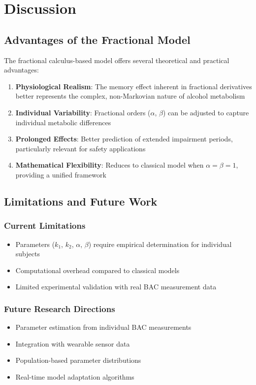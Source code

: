 \documentclass[11pt]{article}
\begin{document}
\section{Discussion}

\subsection{Advantages of the Fractional Model}

The fractional calculus-based model offers several theoretical and practical advantages:

\begin{enumerate}
    \item \textbf{Physiological Realism}: The memory effect inherent in fractional derivatives better represents the complex, non-Markovian nature of alcohol metabolism
    
    \item \textbf{Individual Variability}: Fractional orders ($\alpha$, $\beta$) can be adjusted to capture individual metabolic differences
    
    \item \textbf{Prolonged Effects}: Better prediction of extended impairment periods, particularly relevant for safety applications
    
    \item \textbf{Mathematical Flexibility}: Reduces to classical model when $\alpha = \beta = 1$, providing a unified framework
\end{enumerate}

\subsection{Limitations and Future Work}

\subsubsection{Current Limitations}
\begin{itemize}
    \item Parameters ($k_1$, $k_2$, $\alpha$, $\beta$) require empirical determination for individual subjects
    \item Computational overhead compared to classical models
    \item Limited experimental validation with real BAC measurement data
\end{itemize}

\subsubsection{Future Research Directions}
\begin{itemize}
    \item Parameter estimation from individual BAC measurements
    \item Integration with wearable sensor data
    \item Population-based parameter distributions
    \item Real-time model adaptation algorithms
\end{itemize}
\end{document}
